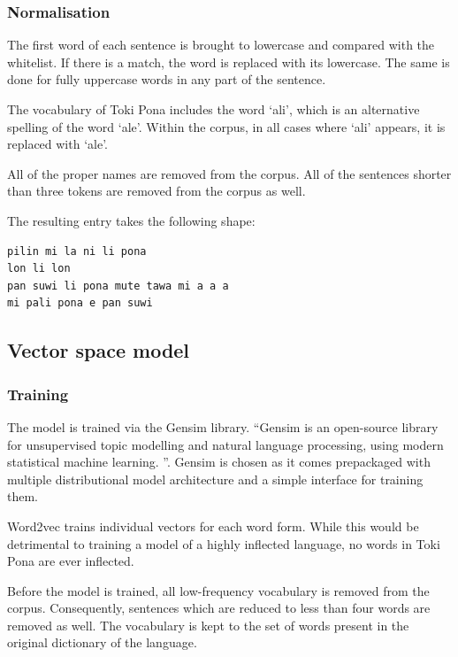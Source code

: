 \documentclass[14pt, a4paper]{extreport}
\begin{document}
      \subsubsection{Normalisation}
The first word of each sentence is brought to lowercase and compared with the whitelist. If there is a match, the word is replaced with its lowercase. The same is done for fully uppercase words in any part of the sentence.

The vocabulary of Toki Pona includes the word `ali', which is an alternative spelling of the word `ale'. Within the corpus, in all cases where `ali' appears, it is replaced with `ale'.

All of the proper names are removed from the corpus. All of the sentences shorter than three tokens are removed from the corpus as well.

The resulting entry takes the following shape:

\begin{lstlisting}
pilin mi la ni li pona
lon li lon
pan suwi li pona mute tawa mi a a a
mi pali pona e pan suwi
\end{lstlisting}

    \subsection{Vector space model}
      \subsubsection{Training}
The model is trained via the Gensim library. ``Gensim is an open-source library for unsupervised topic modelling and natural language processing, using modern statistical machine learning. \parencite{gensim}''. Gensim is chosen as it comes prepackaged with multiple distributional model architecture and a simple interface for training them.

Word2vec trains individual vectors for each word form. While this would be detrimental to training a model of a highly inflected language, no words in Toki Pona are ever inflected.

Before the model is trained, all low-frequency vocabulary is removed from the corpus. Consequently, sentences which are reduced to less than four words are removed as well. The vocabulary is kept to the set of words present in the original dictionary of the language.
\end{document}
